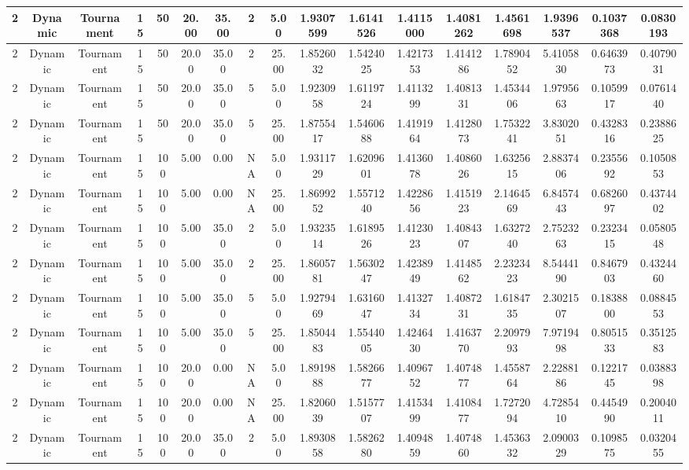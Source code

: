\begin{longtable}{ | c | c | c | c | c | c | c | c | c | c | c | c | c | c | c | c | c | }
	\hline
	2	&	Dynamic	&	Tournament	&	15	&	50	&	20.00	&	35.00	&	2	&	5.00	&	1.9307599	&	1.6141526	&	1.4115000	&	1.4081262	&	1.4561698	&	1.9396537	&	0.1037368	&	0.0830193 \\
	\hline
	2	&	Dynamic	&	Tournament	&	15	&	50	&	20.00	&	35.00	&	2	&	25.00	&	1.8526032	&	1.5424025	&	1.4217353	&	1.4141286	&	1.7890452	&	5.4105830	&	0.6463973	&	0.4079031 \\
	\hline
	2	&	Dynamic	&	Tournament	&	15	&	50	&	20.00	&	35.00	&	5	&	5.00	&	1.9230958	&	1.6119724	&	1.4113299	&	1.4081331	&	1.4534406	&	1.9795663	&	0.1059917	&	0.0761440 \\
	\hline
	2	&	Dynamic	&	Tournament	&	15	&	50	&	20.00	&	35.00	&	5	&	25.00	&	1.8755417	&	1.5460688	&	1.4191964	&	1.4128073	&	1.7532241	&	3.8302051	&	0.4328316	&	0.2388625 \\
	\hline
	2	&	Dynamic	&	Tournament	&	15	&	100	&	5.00	&	0.00	&	NA	&	5.00	&	1.9311729	&	1.6209601	&	1.4136078	&	1.4086026	&	1.6325615	&	2.8837406	&	0.2355692	&	0.1050853 \\
	\hline
	2	&	Dynamic	&	Tournament	&	15	&	100	&	5.00	&	0.00	&	NA	&	25.00	&	1.8699252	&	1.5571240	&	1.4228656	&	1.4151923	&	2.1464569	&	6.8457443	&	0.6826097	&	0.4374402 \\
	\hline
	2	&	Dynamic	&	Tournament	&	15	&	100	&	5.00	&	35.00	&	2	&	5.00	&	1.9323514	&	1.6189526	&	1.4123023	&	1.4084307	&	1.6327240	&	2.7523263	&	0.2323415	&	0.0580548 \\
	\hline
	2	&	Dynamic	&	Tournament	&	15	&	100	&	5.00	&	35.00	&	2	&	25.00	&	1.8605781	&	1.5630247	&	1.4238949	&	1.4148562	&	2.2323423	&	8.5444190	&	0.8467903	&	0.4324460 \\
	\hline
	2	&	Dynamic	&	Tournament	&	15	&	100	&	5.00	&	35.00	&	5	&	5.00	&	1.9279469	&	1.6316047	&	1.4132734	&	1.4087231	&	1.6184735	&	2.3021507	&	0.1838800	&	0.0884553 \\
	\hline
	2	&	Dynamic	&	Tournament	&	15	&	100	&	5.00	&	35.00	&	5	&	25.00	&	1.8504483	&	1.5544005	&	1.4246430	&	1.4163770	&	2.2097993	&	7.9719498	&	0.8051533	&	0.3512583 \\
	\hline
	2	&	Dynamic	&	Tournament	&	15	&	100	&	20.00	&	0.00	&	NA	&	5.00	&	1.8919888	&	1.5826677	&	1.4096752	&	1.4074877	&	1.4558764	&	2.2288186	&	0.1221745	&	0.0388398 \\
	\hline
	2	&	Dynamic	&	Tournament	&	15	&	100	&	20.00	&	0.00	&	NA	&	25.00	&	1.8206039	&	1.5157707	&	1.4153499	&	1.4108477	&	1.7272094	&	4.7285410	&	0.4454990	&	0.2004011 \\
	\hline
	2	&	Dynamic	&	Tournament	&	15	&	100	&	20.00	&	35.00	&	2	&	5.00	&	1.8930858	&	1.5826280	&	1.4094859	&	1.4074860	&	1.4536332	&	2.0900329	&	0.1098575	&	0.0320455 \\

\end{longtable}
